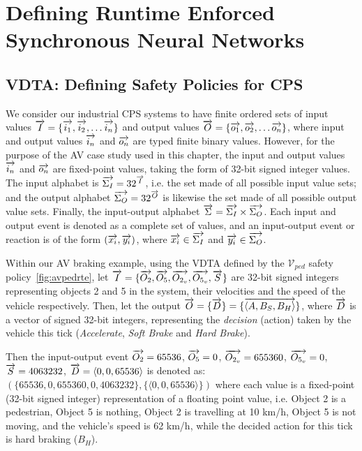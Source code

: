 \section{Defining Runtime Enforced Synchronous Neural Networks}
\subsection{\ac{VDTA}: Defining Safety Policies for \ac{CPS}}

We consider our industrial \ac{CPS} systems to have finite ordered sets of input values $\overrightarrow{I} = \{\overrightarrow{i_1}, \overrightarrow{i_2}, \ldots \overrightarrow{i_n}\}$ and output values $\overrightarrow{O} = \{\overrightarrow{o_1}, \overrightarrow{o_2}, \ldots \overrightarrow{o_n}\}$, where input and output values $\overrightarrow{i_n}$ and $\overrightarrow{o_n}$ are typed finite binary values.
However, for the purpose of the \ac{AV} case study used in this chapter, the input and output values $\overrightarrow{i_n}$ and $\overrightarrow{o_n}$ are fixed-point values, taking the form of 32-bit signed integer values.
The input alphabet is $\overrightarrow{\Sigma_I} = 32^{\overrightarrow{I}}$, i.e. the set made of all possible input value sets; and the output alphabet $\overrightarrow{\Sigma_O} = 32^{\overrightarrow{O}}$ is likewise the set made of all possible output value sets.
Finally, the input-output alphabet $\overrightarrow{\Sigma} = \overrightarrow{\Sigma_I} \times \overrightarrow{\Sigma_O}$. 
Each input and output event is denoted as a complete set of values, and an input-output event or reaction is of the form $(\overrightarrow{x_i}, \overrightarrow{y_i})$, where $\overrightarrow{x_i} \in \overrightarrow{\Sigma_I}$ and $\overrightarrow{y_i} \in \overrightarrow{\Sigma_O}$. 

\begin{example}
	\label{ex:io}
	Within our \ac{AV} braking example, using the \ac{VDTA} defined by the $\mathcal{V}_{ped}$ safety policy~\ref{fig:avpedrte}, let $\overrightarrow{I} = \{\overrightarrow{O_2}, \overrightarrow{O_5}, \overrightarrow{O_{2_v}}, \overrightarrow{O_{5_v}}, \overrightarrow{S}\}$ are 32-bit signed integers representing objects 2 and 5 in the system, their velocities and the speed of the vehicle respectively.
	Then, let the output $\overrightarrow{O} = \{\overrightarrow{D}\} = \{\overrightarrow{\langle A, B_S, B_H \rangle}\}$, where $\overrightarrow{D}$ is a vector of signed 32-bit integers, representing the \textit{decision} (action) taken by the vehicle this tick (\textit{Accelerate}, \textit{Soft Brake} and \textit{Hard Brake}).
	
	Then the input-output event $\overrightarrow{O_2}=65536$, $\overrightarrow{O_5}=0$, $\overrightarrow{O_{2_v}} = 655360$, $\overrightarrow{O_{5_v}} = 0$,  $\overrightarrow{S} = 4063232$, $\overrightarrow{D} = \langle 0, 0, 65536 \rangle$ is denoted as:\\$(\{65536, 0, 655360, 0, 4063232\}, \{\langle 0, 0, 65536 \rangle\})$ where each value is a fixed-point (32-bit signed integer) representation of a floating point value, i.e. Object 2 is a pedestrian, Object 5 is nothing, Object 2 is travelling at 10 km/h, Object 5 is not moving, and the vehicle's speed is 62 km/h, while the decided action for this tick is hard braking ($B_H$).
\end{example}

